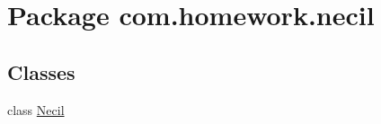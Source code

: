 \hypertarget{namespacecom_1_1homework_1_1necil}{}\section{Package com.\+homework.\+necil}
\label{namespacecom_1_1homework_1_1necil}
\subsection*{Classes}
\begin{DoxyCompactItemize}
\item 
class \hyperlink{classcom_1_1homework_1_1necil_1_1_necil}{Necil}
\end{DoxyCompactItemize}
